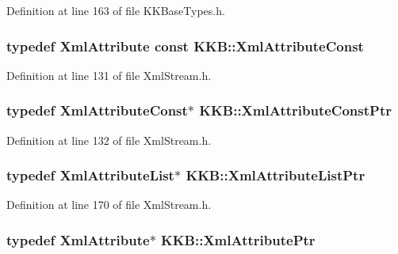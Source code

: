 Definition at line 163 of file K\+K\+Base\+Types.\+h.

\subsubsection[{\texorpdfstring{Xml\+Attribute\+Const}{XmlAttributeConst}}]{\setlength{\rightskip}{0pt plus 5cm}typedef {\bf Xml\+Attribute} const {\bf K\+K\+B\+::\+Xml\+Attribute\+Const}}\hypertarget{namespace_k_k_b_a52995273e2b6fbc01d455674b3ec0a2f}{}\label{namespace_k_k_b_a52995273e2b6fbc01d455674b3ec0a2f}


Definition at line 131 of file Xml\+Stream.\+h.

\subsubsection[{\texorpdfstring{Xml\+Attribute\+Const\+Ptr}{XmlAttributeConstPtr}}]{\setlength{\rightskip}{0pt plus 5cm}typedef {\bf Xml\+Attribute\+Const}$\ast$ {\bf K\+K\+B\+::\+Xml\+Attribute\+Const\+Ptr}}\hypertarget{namespace_k_k_b_afa7c3acb722883d8287413976084f230}{}\label{namespace_k_k_b_afa7c3acb722883d8287413976084f230}


Definition at line 132 of file Xml\+Stream.\+h.

\subsubsection[{\texorpdfstring{Xml\+Attribute\+List\+Ptr}{XmlAttributeListPtr}}]{\setlength{\rightskip}{0pt plus 5cm}typedef {\bf Xml\+Attribute\+List}$\ast$ {\bf K\+K\+B\+::\+Xml\+Attribute\+List\+Ptr}}\hypertarget{namespace_k_k_b_aecd3ac562232833cabb5bb2ffe86ddac}{}\label{namespace_k_k_b_aecd3ac562232833cabb5bb2ffe86ddac}


Definition at line 170 of file Xml\+Stream.\+h.

\subsubsection[{\texorpdfstring{Xml\+Attribute\+Ptr}{XmlAttributePtr}}]{\setlength{\rightskip}{0pt plus 5cm}typedef {\bf Xml\+Attribute}$\ast$ {\bf K\+K\+B\+::\+Xml\+Attribute\+Ptr}}\hypertarget{namespace_k_k_b_a4a5163ef82488376826c02944d6ef6c8}{}\label{namespace_k_k_b_a4a5163ef82488376826c02944d6ef6c8}


